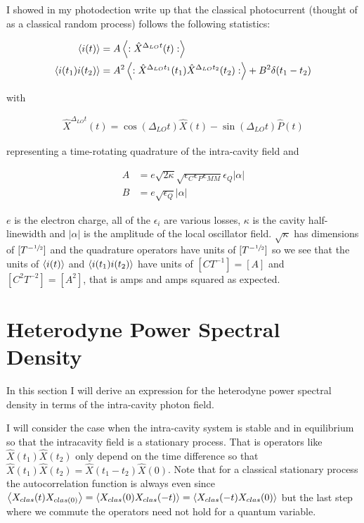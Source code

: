 \documentclass[12pt]{article}
\begin{document}
I showed in my photodection write up that the classical photocurrent (thought of as a classical random process) follows the following statistics:

\begin{align}
\Braket{i(t)} &= A\left<:\hat{X}^{\Delta_{LO} t}(t):\right>\\
\Braket{i(t_1)i(t_2)} &= A^2 \left<:\hat{X}^{\Delta_{LO}t_1}(t_1)\hat{X}^{\Delta_{LO}t_2}(t_2):\right> + B^2 \delta(t_1-t_2)
\end{align}

with 

\begin{align}
\hat{X}^{\Delta_{LO} t}(t) = \cos(\Delta_{LO}t) \hat{X}(t) - \sin(\Delta_{LO}t)\hat{P}(t)
\end{align}

representing a time-rotating quadrature of the intra-cavity field and

\begin{align}
A &= e \sqrt{2\kappa}\sqrt{\epsilon_C \epsilon_P \epsilon_{MM}} \epsilon_Q |\alpha|\\
B &= e \sqrt{\epsilon_Q} |\alpha|
\end{align}

$e$ is the electron charge, all of the $\epsilon_i$ are various losses, $\kappa$ is the cavity half-linewidth and $|\alpha|$ is the amplitude of the local oscillator field. $\sqrt{\kappa}$ has dimensions of $[T^{-\sfrac{1}{2}}]$ and the quadrature operators have units of $[T^{-\sfrac{1}{2}}]$ so we see that the units of $\Braket{i(t)}$ and $\Braket{i(t_1)i(t_2)}$ have units of $[C T^{-1}]=[A]$ and $[C^2 T^{-2}] = [A^2]$, that is amps and amps squared as expected.

\section{Heterodyne Power Spectral Density}

In this section I will derive an expression for the heterodyne power spectral density in terms of the intra-cavity photon field. 

I will consider the case when the intra-cavity system is stable and in equilibrium so that the intracavity field is a stationary process. That is operators like $\hat{X}(t_1)\hat{X}(t_2)$ only depend on the time difference so that $\hat{X}(t_1)\hat{X}(t_2) = \hat{X}(t_1-t_2)\hat{X}(0)$. Note that for a classical stationary process the autocorrelation function is always even since $\Braket{X_{clas}(t)X_{clas(0)}} = \Braket{X_{clas}(0)X_{clas}(-t)} = \Braket{X_{clas}(-t)X_{clas}(0)}$ but the last step where we commute the operators need not hold for a quantum variable.
\end{document}
